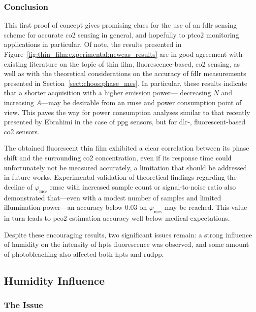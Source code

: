 \subsubsection{Conclusion}

This first proof of concept gives promising clues for the use of an \gls{fdlr} sensing scheme for accurate \gls{co2} sensing in general, and hopefully to \gls{ptco2} monitoring applications in particular. Of note, the results presented in Figure~\ref{fig:thin_film:experimental:newcas_results} are in good agreement with existing literature on the topic of thin film, fluorescence-based, \gls{co2} sensing\cite{borisov2011}, as well as with the theoretical considerations on the accuracy of \gls{fdlr} measurements presented in Section~\ref{sect:choos:phase_mes}. In particular, these results indicate that a shorter acquisition with a higher emission power---\ie{} decreasing $N$ and increasing $A$---may be desirable from an \gls{rmse} and power consumption point of view. This paves the way for power consumption analyses similar to that recently presented by Ebrahimi \etal{} in the case of \gls{ppg} sensors\cite{ebrahimi2023}, but for \gls{dlr}-, fluorescent-based \gls{co2} sensors.

The obtained fluorescent thin film exhibited a clear correlation between its phase shift and the surrounding \gls{co2} concentration, even if its response time could unfortunately not be measured accurately, a limitation that should be addressed in future works. Experimental validation of theoretical findings regarding the decline of $\varphi_\text{mes}$ \gls{rmse} with increased sample count or signal-to-noise ratio also demonstrated that---even with a modest number of samples and limited illumination power---an accuracy below 0.03{\degree} on $\varphi_\text{mes}$ may be reached. This value in turn leads to \gls{pco2} estimation accuracy well below medical expectations.

Despite these encouraging results, two significant issues remain: a strong influence of humidity on the intensity of \gls{hpts} fluorescence was observed, and some amount of photobleaching also affected both \gls{hpts} and \gls{rudpp}.

\subsection{Humidity Influence}\label{sect:thin_film:experimental:humid}

\subsubsection{The Issue}

